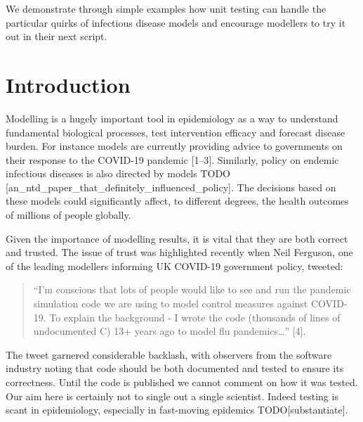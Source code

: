 \documentclass[10pt,letterpaper]{article}
\begin{document}
We demonstrate through simple examples how unit testing can handle the particular quirks of infectious disease models and encourage modellers to try it out in their next script.


\linenumbers

\newpage

\hypertarget{introduction}{%
\section{Introduction}\label{introduction}}

Modelling is a hugely important tool in epidemiology as a way to understand fundamental biological processes, test intervention efficacy and forecast disease burden.
For instance models are currently providing advice to governments on their response to the COVID-19 pandemic {[}1--3{]}.
Similarly, policy on endemic infectious diseases is also directed by models TODO {[}an\_ntd\_paper\_that\_definitely\_influenced\_policy{]}.
The decisions based on these models could significantly affect, to different degrees, the health outcomes of millions of people globally.

Given the importance of modelling results, it is vital that they are both correct and trusted.
The issue of trust was highlighted recently when Neil Ferguson, one of the leading modellers informing UK COVID-19 government policy, tweeted:

\begin{quote}
``I'm conscious that lots of people would like to see and run the pandemic simulation code we are using to model control measures against COVID-19. To explain the background - I wrote the code (thousands of lines of undocumented C) 13+ years ago to model flu pandemics\ldots{}'' {[}4{]}.
\end{quote}

The tweet garnered considerable backlash, with observers from the software industry noting that code should be both documented and tested to ensure its correctness.
Until the code is published we cannot comment on how it was tested.
Our aim here is certainly not to single out a single scientist. Indeed testing is scant in epidemiology, especially in fast-moving epidemics TODO{[}substantiate{]}.
\end{document}
